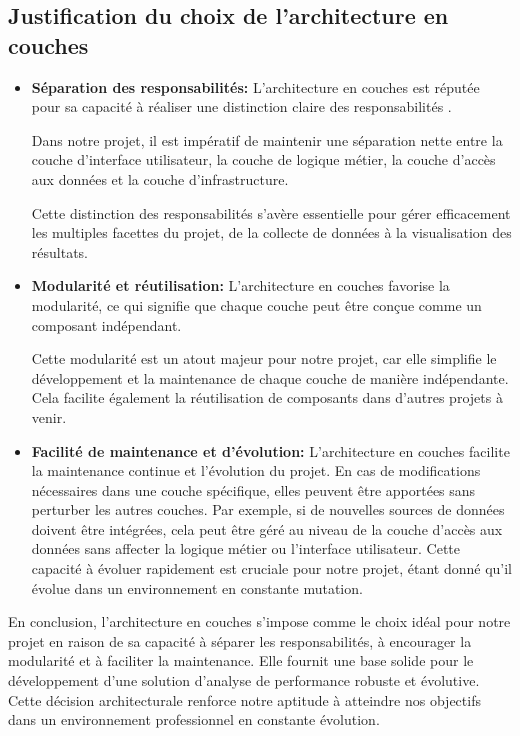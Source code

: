 \subsection{Justification du choix de l'architecture en couches}
\begin{itemize}
        \item \textbf{Séparation des responsabilités: }L'architecture en couches est réputée pour sa capacité à réaliser une distinction claire des responsabilités \cite{sep}. 
        \par Dans notre projet, il est impératif de maintenir une séparation nette entre la couche d'interface utilisateur, la couche de logique métier, la couche d'accès aux données et la couche d'infrastructure. 
        \par Cette distinction des responsabilités s'avère essentielle pour gérer efficacement les multiples facettes du projet, de la collecte de données à la visualisation des résultats.
        \item \textbf{Modularité et réutilisation: }L'architecture en couches favorise la modularité, ce qui signifie que chaque couche peut être conçue comme un composant indépendant. \cite{module}
        \par Cette modularité est un atout majeur pour notre projet, car elle simplifie le développement et la maintenance de chaque couche de manière indépendante. Cela facilite également la réutilisation de composants dans d'autres projets à venir. 
        \item \textbf{Facilité de maintenance et d'évolution:} L'architecture en couches facilite la maintenance continue et l'évolution du projet. En cas de modifications nécessaires dans une couche spécifique, elles peuvent être apportées sans perturber les autres couches. Par exemple, si de nouvelles sources de données doivent être intégrées, cela peut être géré au niveau de la couche d'accès aux données sans affecter la logique métier ou l'interface utilisateur.\cite{facilite} Cette capacité à évoluer rapidement est cruciale pour notre projet, étant donné qu'il évolue dans un environnement en constante mutation.
\end{itemize}
\par En conclusion, l'architecture en couches s'impose comme le choix idéal pour notre projet en raison de sa capacité à séparer les responsabilités, à encourager la modularité et à faciliter la maintenance. Elle fournit une base solide pour le développement d'une solution d'analyse de performance robuste et évolutive. Cette décision architecturale renforce notre aptitude à atteindre nos objectifs dans un environnement professionnel en constante évolution.

